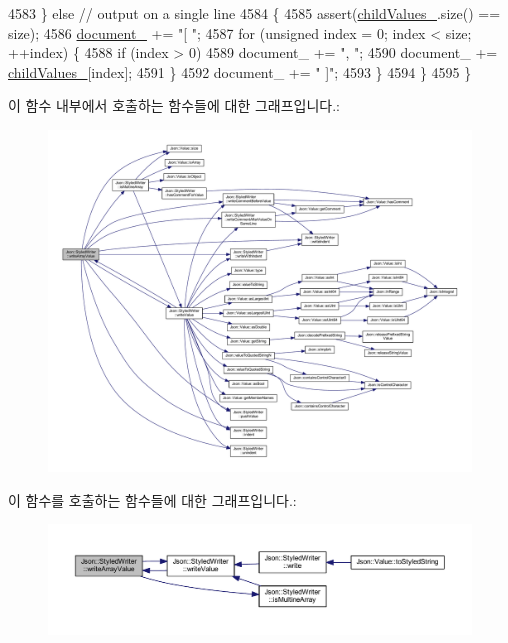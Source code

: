 \begin{DoxyCode}
4583     \} \textcolor{keywordflow}{else} \textcolor{comment}{// output on a single line}
4584     \{
4585       assert(\hyperlink{class_json_1_1_styled_writer_a1f905495f0705365af117ec541e29fdf}{childValues\_}.size() == size);
4586       \hyperlink{class_json_1_1_styled_writer_ae967b0c77e4d7cb889ce7b6ee4ce28d7}{document\_} += \textcolor{stringliteral}{"[ "};
4587       \textcolor{keywordflow}{for} (\textcolor{keywordtype}{unsigned} index = 0; index < size; ++index) \{
4588         \textcolor{keywordflow}{if} (index > 0)
4589           document\_ += \textcolor{stringliteral}{", "};
4590         document\_ += \hyperlink{class_json_1_1_styled_writer_a1f905495f0705365af117ec541e29fdf}{childValues\_}[index];
4591       \}
4592       document\_ += \textcolor{stringliteral}{" ]"};
4593     \}
4594   \}
4595 \}
\end{DoxyCode}
이 함수 내부에서 호출하는 함수들에 대한 그래프입니다.\+:
\nopagebreak
\begin{figure}[H]
\begin{center}
\leavevmode
\includegraphics[width=350pt]{class_json_1_1_styled_writer_a0618c23d62965515def15ece1e677f5d_cgraph}
\end{center}
\end{figure}
이 함수를 호출하는 함수들에 대한 그래프입니다.\+:\nopagebreak
\begin{figure}[H]
\begin{center}
\leavevmode
\includegraphics[width=350pt]{class_json_1_1_styled_writer_a0618c23d62965515def15ece1e677f5d_icgraph}
\end{center}
\end{figure}
